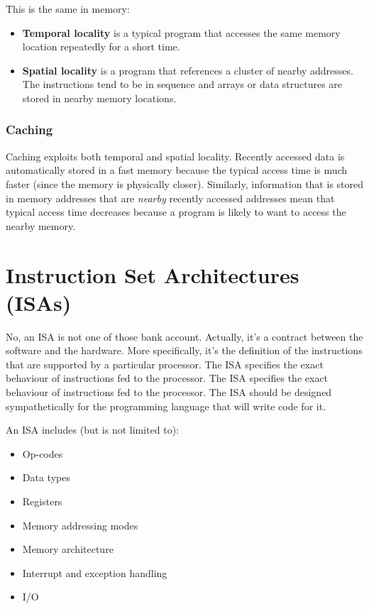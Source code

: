 \documentclass[11pt,a4paper,titlepage,dvipsnames,cmyk]{scrartcl}
\begin{document}
This is the same in memory:
\begin{itemize}
    \item \textbf{Temporal locality} is a typical program that accesses
        the same memory location repeatedly for a short time.
    \item \textbf{Spatial locality} is a program that references a cluster
        of nearby addresses. The instructions tend to be in sequence and
        arrays or data structures are stored in nearby memory locations.
\end{itemize}

\subsubsection{Caching}%
\label{ssub:Caching}
Caching exploits both temporal and spatial locality. Recently accessed
data is automatically stored in a fast memory because the typical access
time is much faster (since the memory is physically closer). Similarly,
information that is stored in memory addresses that are \textit{nearby}
recently accessed addresses mean that typical access time decreases
because a program is likely to want to access the nearby memory.

\section{Instruction Set Architectures (ISAs)}%
\label{sec:ISAs}
No, an ISA is not one of those bank account. Actually, it's a contract
between the software and the hardware. More specifically, it's the
definition of the instructions that are supported by a particular
processor. The ISA specifies the exact behaviour of instructions fed to
the processor. The ISA specifies the exact behaviour of instructions fed
to the processor. The ISA should be designed sympathetically for the
programming language that will write code for it.

An ISA includes (but is not limited to):
\begin{itemize}
    \item Op-codes
    \item Data types
    \item Registers
    \item Memory addressing modes
    \item Memory architecture
    \item Interrupt and exception handling
    \item I/O
\end{itemize}
\end{document}
